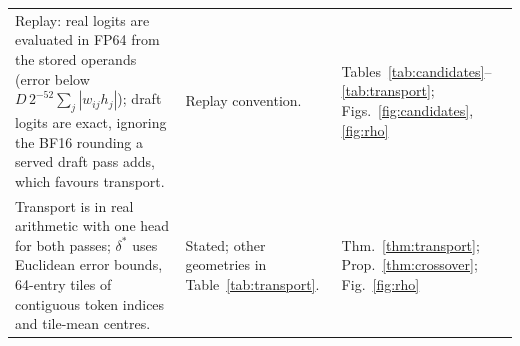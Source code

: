 \begin{table}[htbp]
\begin{tabularx}{\textwidth}{@{}>{\raggedright\arraybackslash}p{7.9cm}Y>{\raggedright\arraybackslash}p{3.3cm}@{}}
Replay: real logits are evaluated in FP64 from the stored operands (error below $D\,2^{-52}\sum_j|w_{ij}h_j|$); draft logits are exact, ignoring the BF16 rounding a served draft pass adds, which favours transport. & Replay convention. & Tables~\ref{tab:candidates}--\ref{tab:transport}; Figs.~\ref{fig:candidates}, \ref{fig:rho}\\\addlinespace[2pt]
Transport is in real arithmetic with one head for both passes; $\delta^\ast$ uses Euclidean error bounds, 64-entry tiles of contiguous token indices and tile-mean centres. & Stated; other geometries in Table~\ref{tab:transport}. & Thm.~\ref{thm:transport}; Prop.~\ref{thm:crossover}; Fig.~\ref{fig:rho}\\
\bottomrule
\end{tabularx}
\end{table}

